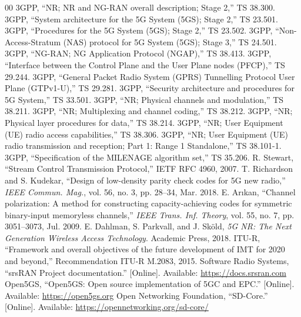 \documentclass[conference]{IEEEtran}
\begin{document}
\begin{thebibliography}{00}
 3GPP, ``NR; NR and NG-RAN overall description; Stage 2,'' TS 38.300.
 3GPP, ``System architecture for the 5G System (5GS); Stage 2,'' TS 23.501.
 3GPP, ``Procedures for the 5G System (5GS); Stage 2,'' TS 23.502.
 3GPP, ``Non-Access-Stratum (NAS) protocol for 5G System (5GS); Stage 3,'' TS 24.501.
 3GPP, ``NG-RAN; NG Application Protocol (NGAP),'' TS 38.413.
 3GPP, ``Interface between the Control Plane and the User Plane nodes (PFCP),'' TS 29.244.
 3GPP, ``General Packet Radio System (GPRS) Tunnelling Protocol User Plane (GTPv1-U),'' TS 29.281.
 3GPP, ``Security architecture and procedures for 5G System,'' TS 33.501.
 3GPP, ``NR; Physical channels and modulation,'' TS 38.211.
 3GPP, ``NR; Multiplexing and channel coding,'' TS 38.212.
 3GPP, ``NR; Physical layer procedures for data,'' TS 38.214.
 3GPP, ``NR; User Equipment (UE) radio access capabilities,'' TS 38.306.
 3GPP, ``NR; User Equipment (UE) radio transmission and reception; Part 1: Range 1 Standalone,'' TS 38.101-1.
 3GPP, ``Specification of the MILENAGE algorithm set,'' TS 35.206.
 R. Stewart, ``Stream Control Transmission Protocol,'' IETF RFC 4960, 2007.
 T. Richardson and S. Kudekar, ``Design of low-density parity check codes for 5G new radio,'' \textit{IEEE Commun. Mag.}, vol. 56, no. 3, pp. 28--34, Mar. 2018.
 E. Arıkan, ``Channel polarization: A method for constructing capacity-achieving codes for symmetric binary-input memoryless channels,'' \textit{IEEE Trans. Inf. Theory}, vol. 55, no. 7, pp. 3051--3073, Jul. 2009.
 E. Dahlman, S. Parkvall, and J. Sköld, \textit{5G NR: The Next Generation Wireless Access Technology}. Academic Press, 2018.
 ITU-R, ``Framework and overall objectives of the future development of IMT for 2020 and beyond,'' Recommendation ITU-R M.2083, 2015.
 Software Radio Systems, ``srsRAN Project documentation.'' [Online]. Available: \url{https://docs.srsran.com}
 Open5GS, ``Open5GS: Open source implementation of 5GC and EPC.'' [Online]. Available: \url{https://open5gs.org}
 Open Networking Foundation, ``SD-Core.'' [Online]. Available: \url{https://opennetworking.org/sd-core/}

\end{thebibliography}
\end{document}
